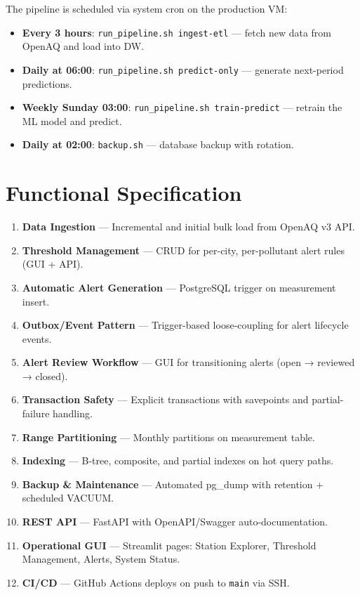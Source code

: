 \documentclass[11pt,a4paper]{article}
\begin{document}
The pipeline is scheduled via system cron on the production VM:
\begin{itemize}[nosep]
  \item \textbf{Every 3 hours}: \texttt{run\_pipeline.sh ingest-etl} --- fetch new data from OpenAQ and load into DW.
  \item \textbf{Daily at 06:00}: \texttt{run\_pipeline.sh predict-only} --- generate next-period predictions.
  \item \textbf{Weekly Sunday 03:00}: \texttt{run\_pipeline.sh train-predict} --- retrain the ML model and predict.
  \item \textbf{Daily at 02:00}: \texttt{backup.sh} --- database backup with rotation.
\end{itemize}

\section{Functional Specification}

\begin{enumerate}[nosep]
  \item \textbf{Data Ingestion} --- Incremental and initial bulk load from OpenAQ v3 API.
  \item \textbf{Threshold Management} --- CRUD for per-city, per-pollutant alert rules (GUI + API).
  \item \textbf{Automatic Alert Generation} --- PostgreSQL trigger on measurement insert.
  \item \textbf{Outbox/Event Pattern} --- Trigger-based loose-coupling for alert lifecycle events.
  \item \textbf{Alert Review Workflow} --- GUI for transitioning alerts (open → reviewed → closed).
  \item \textbf{Transaction Safety} --- Explicit transactions with savepoints and partial-failure handling.
  \item \textbf{Range Partitioning} --- Monthly partitions on measurement table.
  \item \textbf{Indexing} --- B-tree, composite, and partial indexes on hot query paths.
  \item \textbf{Backup \& Maintenance} --- Automated pg\_dump with retention + scheduled VACUUM.
  \item \textbf{REST API} --- FastAPI with OpenAPI/Swagger auto-documentation.
  \item \textbf{Operational GUI} --- Streamlit pages: Station Explorer, Threshold Management, Alerts, System Status.
  \item \textbf{CI/CD} --- GitHub Actions deploys on push to \texttt{main} via SSH.
\end{enumerate}
\end{document}
